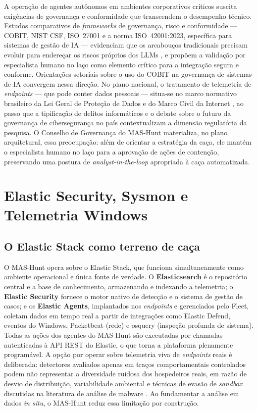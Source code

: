 A operação de agentes autônomos em ambientes corporativos críticos suscita exigências de governança e conformidade que transcendem o desempenho técnico. Estudos comparativos de \textit{frameworks} de governança, risco e conformidade — COBIT, NIST CSF, ISO~27001 e a norma ISO~42001:2023, específica para sistemas de gestão de IA — evidenciam que os arcabouços tradicionais precisam evoluir para endereçar os riscos próprios dos LLMs \cite{McIntosh2024, mcintosh2024cobit}, e propõem a validação por especialista humano no laço como elemento crítico para a integração segura e conforme. Orientações setoriais sobre o uso do COBIT na governança de sistemas de IA \cite{isaca2025leveraging} convergem nessa direção. No plano nacional, o tratamento de telemetria de \textit{endpoints} — que pode conter dados pessoais — situa-se no marco normativo brasileiro da Lei Geral de Proteção de Dados \cite{LGPD2018} e do Marco Civil da Internet \cite{MarcoCivil2014}, ao passo que a tipificação de delitos informáticos \cite{Dieckmann2012} e o debate sobre o futuro da governança de cibersegurança no país \cite{FGV2023} contextualizam a dimensão regulatória da pesquisa. O Conselho de Governança do MAS-Hunt materializa, no plano arquitetural, essa preocupação: além de orientar a estratégia da caça, ele mantém o especialista humano no laço para a aprovação de ações de contenção, preservando uma postura de \textit{analyst-in-the-loop} apropriada à caça automatizada.

\section{Elastic Security, Sysmon e Telemetria Windows}
\label{sec:telemetria}

\subsection{O Elastic Stack como terreno de caça}
\label{subsec:elastic}

O MAS-Hunt opera sobre o Elastic Stack, que funciona simultaneamente como ambiente operacional e única fonte de verdade. O \textbf{Elasticsearch} é o repositório central e a base de conhecimento, armazenando e indexando a telemetria; o \textbf{Elastic Security} fornece o motor nativo de detecção e o sistema de gestão de casos; e os \textbf{Elastic Agents}, implantados nos \textit{endpoints} e gerenciados pelo Fleet, coletam dados em tempo real a partir de integrações como Elastic Defend, eventos do Windows, Packetbeat (rede) e osquery (inspeção profunda de sistema). Todas as ações dos agentes do MAS-Hunt são executadas por chamadas autenticadas à API REST do Elastic, o que torna a plataforma plenamente programável. A opção por operar sobre telemetria viva de \textit{endpoints} reais é deliberada: detectores avaliados apenas em traços comportamentais controlados podem não representar a diversidade ruidosa dos hospedeiros reais, em razão de desvio de distribuição, variabilidade ambiental e técnicas de evasão de \textit{sandbox} discutidas na literatura de análise de malware \cite{ucci2019}. Ao fundamentar a análise em dados \textit{in situ}, o MAS-Hunt reduz essa limitação por construção.

